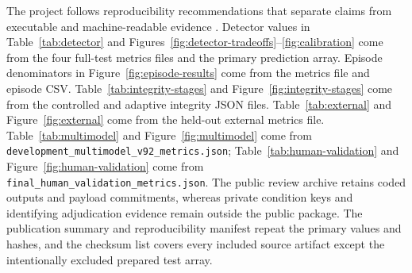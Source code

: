 The project follows reproducibility recommendations that separate claims from executable and machine-readable evidence \citep{pineau2021reproducibility}. Detector values in Table~\ref{tab:detector} and Figures~\ref{fig:detector-tradeoffs}--\ref{fig:calibration} come from the four full-test metrics files and the primary prediction array. Episode denominators in Figure~\ref{fig:episode-results} come from the metrics file and episode CSV. Table~\ref{tab:integrity-stages} and Figure~\ref{fig:integrity-stages} come from the controlled and adaptive integrity JSON files. Table~\ref{tab:external} and Figure~\ref{fig:external} come from the held-out external metrics file. Table~\ref{tab:multimodel} and Figure~\ref{fig:multimodel} come from \texttt{development\_multimodel\_v92\_metrics.json}; Table~\ref{tab:human-validation} and Figure~\ref{fig:human-validation} come from \texttt{final\_human\_validation\_metrics.json}. The public review archive retains coded outputs and payload commitments, whereas private condition keys and identifying adjudication evidence remain outside the public package. The publication summary and reproducibility manifest repeat the primary values and hashes, and the checksum list covers every included source artifact except the intentionally excluded prepared test array.

